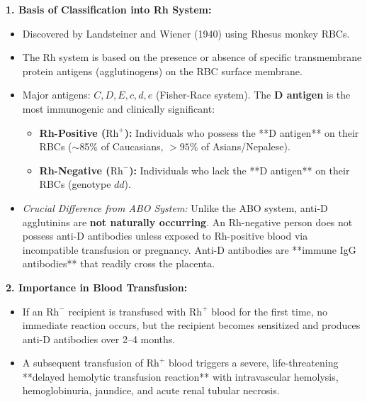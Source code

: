 \documentclass[11pt,a4paper]{article}
\begin{document}
\begin{ansbox}
\textbf{1. Basis of Classification into Rh System:}
\begin{itemize}[leftmargin=*]
    \item Discovered by Landsteiner and Wiener (1940) using Rhesus monkey RBCs.
    \item The Rh system is based on the presence or absence of specific transmembrane protein antigens (agglutinogens) on the RBC surface membrane.
    \item Major antigens: $C, D, E, c, d, e$ (Fisher-Race system). The \textbf{D antigen} is the most immunogenic and clinically significant:
    \begin{itemize}
        \item \textbf{Rh-Positive ($\text{Rh}^+$):} Individuals who possess the **D antigen** on their RBCs ($\sim$85\% of Caucasians, $>95\%$ of Asians/Nepalese).
        \item \textbf{Rh-Negative ($\text{Rh}^-$):} Individuals who lack the **D antigen** on their RBCs (genotype $dd$).
    \end{itemize}
    \item \textit{Crucial Difference from ABO System:} Unlike the ABO system, anti-D agglutinins are \textbf{not naturally occurring}. An Rh-negative person does not possess anti-D antibodies unless exposed to Rh-positive blood via incompatible transfusion or pregnancy. Anti-D antibodies are **immune IgG antibodies** that readily cross the placenta.
\end{itemize}

\textbf{2. Importance in Blood Transfusion:}
\begin{itemize}[leftmargin=*]
    \item If an $\text{Rh}^-$ recipient is transfused with $\text{Rh}^+$ blood for the first time, no immediate reaction occurs, but the recipient becomes sensitized and produces anti-D antibodies over 2--4 months.
    \item A subsequent transfusion of $\text{Rh}^+$ blood triggers a severe, life-threatening **delayed hemolytic transfusion reaction** with intravascular hemolysis, hemoglobinuria, jaundice, and acute renal tubular necrosis.
\end{itemize}


\end{ansbox}
\end{document}
